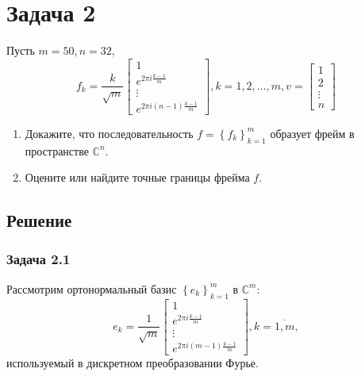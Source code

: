 \documentclass[a4paper,article,10pt]{extarticle}
\begin{document}
\section{Задача 2}
Пусть $m=50,n=32,$
\[
	f_k = \frac{k}{\sqrt{m}} \begin{bmatrix} 1 \\ e^{2 \pi i \frac{k-1}{m}} \\ \vdots \\ e^{2 \pi i \left(n-1\right) \frac{k-1}{m}}\end{bmatrix}, k=1,2,\dots,m, v = \begin{bmatrix} 1\\2\\\vdots\\n\end{bmatrix}
\]
\begin{enumerate}
	\item{Докажите, что последовательность $f=\left\{f_k\right\}_{k=1}^m$ образует фрейм в пространстве $\mathbb{C}^n$.}
	\item{Оцените или найдите точные границы фрейма $f$.}
\end{enumerate}
\subsection{Решение}
\subsubsection{Задача 2.1}
Рассмотрим ортонормальный базис $\left\{ e_k \right\}_{k=1}^m$ в $\mathbb{C}^m$:
\[
	e_k = \frac{1}{\sqrt{m}} \begin{bmatrix} 1 \\ e^{2 \pi i \frac{k-1}{m}} \\ \vdots \\ e^{2 \pi i \left(m-1\right) \frac{k-1}{m}}\end{bmatrix}, k=\overline{1,m},
\]
используемый в дискретном преобразовании Фурье.
\end{document}
